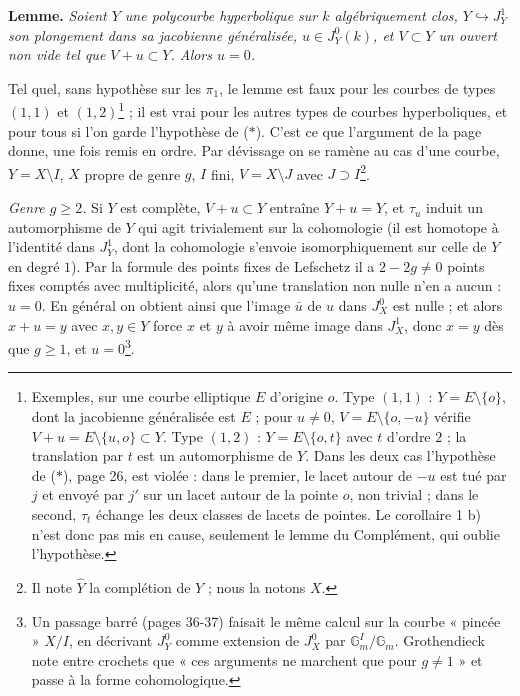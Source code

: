 \documentclass[11pt,a4paper]{article}
\begin{document}
\textbf{Lemme.} \emph{Soient $Y$ une polycourbe hyperbolique sur $k$
algébriquement clos, $Y \hookrightarrow J^1_Y$ son plongement dans sa
jacobienne généralisée, $u \in J^0_Y(k)$, et $V \subset Y$ un ouvert non vide
tel que $V + u \subset Y$. Alors $u = 0$.}

Tel quel, sans hypothèse sur les $\pi_1$, le lemme est faux pour les courbes de
types $(1,1)$ et $(1,2)$\footnote{Exemples, sur une courbe elliptique $E$
d'origine $o$. Type $(1,1)$ : $Y = E \setminus \{o\}$, dont la jacobienne
généralisée est $E$ ; pour $u \ne 0$, $V = E \setminus \{o, -u\}$ vérifie $V +
u = E \setminus \{u, o\} \subset Y$. Type $(1,2)$ : $Y = E \setminus \{o,
t\}$ avec $t$ d'ordre $2$ ; la translation par $t$ est un automorphisme de $Y$.
Dans les deux cas l'hypothèse de ($\ast$), page 26, est violée : dans le
premier, le lacet autour de $-u$ est tué par $j$ et envoyé par $j'$ sur un
lacet autour de la pointe $o$, non trivial ; dans le second, $\tau_t$ échange
les deux classes de lacets de pointes. Le corollaire 1 b) n'est donc pas mis en
cause, seulement le lemme du Complément, qui oublie l'hypothèse.} ; il est
vrai pour les autres types de courbes hyperboliques, et pour tous si l'on
garde l'hypothèse de ($\ast$). C'est ce que l'argument de la page donne, une
fois remis en ordre. Par dévissage on se ramène au cas d'une courbe, $Y = X
\setminus I$, $X$ propre de genre $g$, $I$ fini, $V = X \setminus J$ avec $J
\supset I$\footnote{Il note $\hat Y$ la complétion de $Y$ ; nous la notons
$X$.}.

\emph{Genre $g \ge 2$.} Si $Y$ est complète, $V + u \subset Y$ entraîne $Y + u
= Y$, et $\tau_u$ induit un automorphisme de $Y$ qui agit trivialement sur la
cohomologie (il est homotope à l'identité dans $J^1_Y$, dont la cohomologie
s'envoie isomorphiquement sur celle de $Y$ en degré $1$). Par la formule des
points fixes de Lefschetz il a $2 - 2g \ne 0$ points fixes comptés avec
multiplicité, alors qu'une translation non nulle n'en a aucun : $u = 0$. En
général on obtient ainsi que l'image $\bar u$ de $u$ dans $J^0_X$ est nulle ;
et alors $x + u = y$ avec $x, y \in Y$ force $x$ et $y$ à avoir même image
dans $J^1_X$, donc $x = y$ dès que $g \ge 1$, et $u = 0$\footnote{Un
passage barré (pages 36-37) faisait le même calcul sur la courbe « pincée »
$X/I$, en décrivant $J^0_Y$ comme extension de $J^0_X$ par
$\mathbb{G}_m^I/\mathbb{G}_m$. Grothendieck note entre crochets que « ces
arguments ne marchent que pour $g \ne 1$ » et passe à la forme
cohomologique.}.
\end{document}

